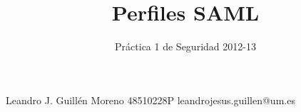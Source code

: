 \documentclass[a4paper,12pt]{article}
\title{Perfiles SAML}
\author{Práctica 1 de Seguridad 2012-13}
\date{}
\begin{document}
\maketitle

\begin{center}
Leandro J. Guillén Moreno 48510228P leandrojesus.guillen@um.es
\end{center}

\tableofcontents

\newpage
 \newpage
 \newpage
 \newpage
\newpage

\nocite{samlcore}
\nocite{samlprofiles}
\nocite{sureshatt}
\nocite{oracle}
\nocite{sessiontracking}
\nocite{virtualbox}
\nocite{msdn}



\end{document}
